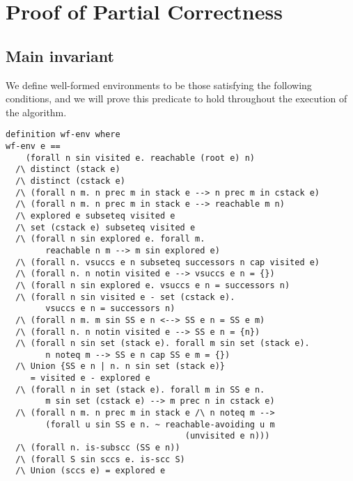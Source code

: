 \documentclass[sigplan,10pt,anonymous,review]{acmart}
\begin{document}
\section{Proof of Partial Correctness}
\label{sec:partial-correctness}

\subsection{Main invariant}
\label{sec:invariant}

We define well-formed environments to be those satisfying the following conditions, and we will prove this predicate to hold throughout the execution of the algorithm.

\begin{small}
\begin{lstlisting}[language=isabelle]
definition wf-env where
wf-env e ==
    (forall n sin visited e. reachable (root e) n)
  /\ distinct (stack e)
  /\ distinct (cstack e)
  /\ (forall n m. n prec m in stack e --> n prec m in cstack e)
  /\ (forall n m. n prec m in stack e --> reachable m n)
  /\ explored e subseteq visited e
  /\ set (cstack e) subseteq visited e
  /\ (forall n sin explored e. forall m. 
        reachable n m --> m sin explored e)
  /\ (forall n. vsuccs e n subseteq successors n cap visited e)
  /\ (forall n. n notin visited e --> vsuccs e n = {})
  /\ (forall n sin explored e. vsuccs e n = successors n)
  /\ (forall n sin visited e - set (cstack e). 
        vsuccs e n = successors n)
  /\ (forall n m. m sin SS e n <--> SS e n = SS e m)
  /\ (forall n. n notin visited e --> SS e n = {n})
  /\ (forall n sin set (stack e). forall m sin set (stack e).
        n noteq m --> SS e n cap SS e m = {})
  /\ Union {SS e n | n. n sin set (stack e)} 
     = visited e - explored e
  /\ (forall n in set (stack e). forall m in SS e n.
        m sin set (cstack e) --> m prec n in cstack e)
  /\ (forall n m. n prec m in stack e /\ n noteq m -->
        (forall u sin SS e n. ~ reachable-avoiding u m 
                                    (unvisited e n)))
  /\ (forall n. is-subscc (SS e n))
  /\ (forall S sin sccs e. is-scc S)
  /\ Union (sccs e) = explored e
\end{lstlisting}
\end{small}
\end{document}
